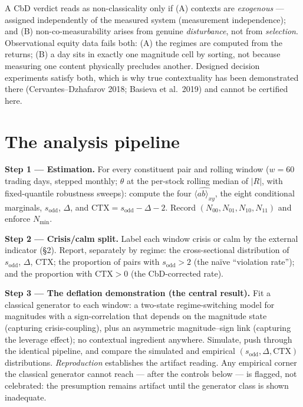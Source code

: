 \documentclass[11pt]{article}
\newcommand{\E}[1]{\langle ab\rangle_{#1}}
\newcommand{\sodd}{s_{\mathrm{odd}}}
\begin{document}
\begin{cautionbox}
A CbD verdict reads as non-classicality only if (A) contexts are \emph{exogenous} ---
assigned independently of the measured system (measurement independence); and (B)
non-co-measurability arises from genuine \emph{disturbance}, not from \emph{selection}.
Observational equity data fails both: (A) the regimes are computed from the returns; (B) a
day sits in exactly one magnitude cell by sorting, not because measuring one content
physically precludes another. Designed decision experiments satisfy both, which is why true
contextuality has been demonstrated there (Cervantes--Dzhafarov 2018; Basieva et al.\ 2019)
and cannot be certified here.
\end{cautionbox}

\section{The analysis pipeline}

\textbf{Step 1 --- Estimation.} For every constituent pair and rolling window
($w=60$ trading days, stepped monthly; $\theta$ at the per-stock rolling median of $|R|$,
with fixed-quantile robustness sweeps): compute the four $\widehat{\E{xy}}$, the eight
conditional marginals, $\sodd$, $\Delta$, and $\mathrm{CTX}=\sodd-\Delta-2$. Record
$(N_{00},N_{01},N_{10},N_{11})$ and enforce $N_{\min}$.

\textbf{Step 2 --- Crisis/calm split.} Label each window crisis or calm by the external
indicator (\S2). Report, separately by regime: the cross-sectional distribution of $\sodd$,
$\Delta$, $\mathrm{CTX}$; the proportion of pairs with $\sodd>2$ (the na\"ive ``violation
rate''); and the proportion with $\mathrm{CTX}>0$ (the CbD-corrected rate).

\textbf{Step 3 --- The deflation demonstration (the central result).} Fit a classical
generator to each window: a two-state regime-switching model for magnitudes with a
sign-correlation that depends on the magnitude state (capturing crisis-coupling), plus an
asymmetric magnitude--sign link (capturing the leverage effect); no contextual ingredient
anywhere. Simulate, push through the identical pipeline, and compare the simulated and
empirical $(\sodd,\Delta,\mathrm{CTX})$ distributions. \emph{Reproduction} establishes the
artifact reading. Any empirical corner the classical generator cannot reach --- after the
controls below --- is flagged, not celebrated: the presumption remains artifact until the
generator class is shown inadequate.
\end{document}
